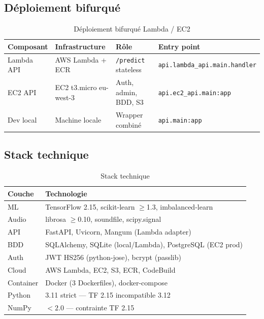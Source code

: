 \documentclass[11pt,a4paper]{article}
\newcommand{\code}[1]{\texttt{\small #1}}
\begin{document}
\subsection{Déploiement bifurqué}

\begin{table}[htbp]
\centering
\begin{tabular}{@{}llll@{}}
\toprule
\textbf{Composant} & \textbf{Infrastructure} & \textbf{Rôle} & \textbf{Entry point} \\
\midrule
Lambda API & AWS Lambda + ECR & \code{/predict} stateless & \code{api.lambda\_api.main.handler} \\
EC2 API & EC2 t3.micro eu-west-3 & Auth, admin, BDD, S3 & \code{api.ec2\_api.main:app} \\
Dev local & Machine locale & Wrapper combiné & \code{api.main:app} \\
\bottomrule
\end{tabular}
\caption{Déploiement bifurqué Lambda / EC2}
\end{table}

\subsection{Stack technique}

\begin{table}[htbp]
\centering
\begin{tabular}{@{}lp{10cm}@{}}
\toprule
\textbf{Couche} & \textbf{Technologie} \\
\midrule
ML & TensorFlow 2.15, scikit-learn $\geq$1.3, imbalanced-learn \\
Audio & librosa $\geq$0.10, soundfile, scipy.signal \\
API & FastAPI, Uvicorn, Mangum (Lambda adapter) \\
BDD & SQLAlchemy, SQLite (local/Lambda), PostgreSQL (EC2 prod) \\
Auth & JWT HS256 (python-jose), bcrypt (passlib) \\
Cloud & AWS Lambda, EC2, S3, ECR, CodeBuild \\
Container & Docker (3 Dockerfiles), docker-compose \\
Python & 3.11 strict — TF 2.15 incompatible 3.12 \\
NumPy & $<2.0$ — contrainte TF 2.15 \\
\bottomrule
\end{tabular}
\caption{Stack technique}
\end{table}
\end{document}
